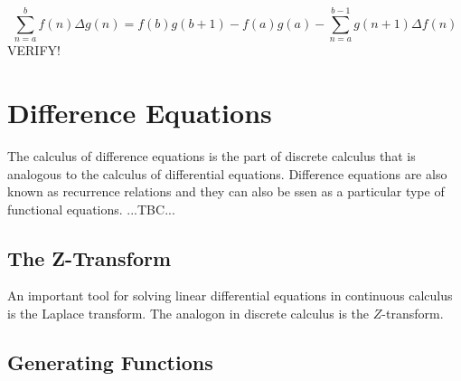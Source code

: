 \begin{equation}
\sum_{n=a}^{b} f(n) \Delta g(n) 
=
f(b) g(b+1) - f(a) g(a) - \sum_{n=a}^{b-1} g(n+1) \Delta f(n)
\end{equation}
VERIFY!









\section{Difference Equations}
The calculus of difference equations is the part of discrete calculus that is analogous to the calculus of differential equations. Difference equations are also known as recurrence relations and they can also be ssen as a particular type of functional equations. ...TBC...


\subsection{The Z-Transform}
An important tool for solving linear differential equations in continuous calculus is the Laplace transform. The analogon in discrete calculus is the $Z$-transform.






\subsection{Generating Functions}




